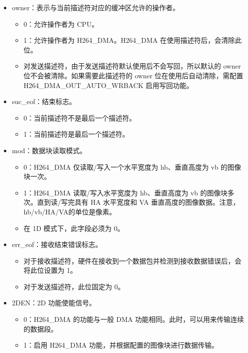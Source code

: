 \documentclass[main\_\_CN.tex]{subfiles}
\begin{document}
\begin{itemize}
\item owner：表示与当前描述符对应的缓冲区允许的操作者。
    \begin{itemize}
    \item 0：允许操作者为 CPU。
    \item 1：允许操作者为 H264\_DMA。H264\_DMA 在使用描述符后，会清除此位。
    \item 对发送描述符，由于发送描述符默认使用后不会写回，所以默认的 owner 位不会被清除。如果需要此描述符的 owner 位在使用后自动清除，需配置 H264\_DMA\_OUT\_AUTO\_WRBACK 启用写回功能。
    \end{itemize}

\item suc\_eof：结束标志。
    \begin{itemize}
    \item 0：当前描述符不是最后一个描述符。
    \item 1：当前描述符是最后一个描述符。
    \end{itemize}
\item mod：数据块读取模式。
    \begin{itemize}
    \item 0：H264\_DMA 仅读取/写入一个水平宽度为 hb、垂直高度为 vb 的图像块一次。
    \item 1：H264\_DMA 读取/写入水平宽度为 hb、垂直高度为 vb 的图像块多次。直到读/写完具有 HA 水平宽度和 VA 垂直高度的图像数据。注意，hb/vb/HA/VA的单位是像素。
    \item 在 1D 模式下，此字段必须为 0。
    \end{itemize}

\item err\_eof：接收结束错误标志。
    \begin{itemize}
    \item 对于接收描述符，硬件在接收到一个数据包并检测到接收数据错误后，会将此位设置为 1。
    \item 对于发送描述符，此位固定为 0。
    \end{itemize}

\item 2DEN：2D 功能使能信号。
    \begin{itemize}
    \item 0：H264\_DMA 的功能与一般 DMA 功能相同。此时，可以用来传输连续的数据段。
    \item 1：启用 H264\_DMA 功能，并根据配置的图像块进行数据传输。
    \end{itemize}


\end{itemize}
\end{document}
